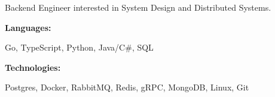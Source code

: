 \documentclass[9pt]{developercv} %
\begin{document}
\begin{minipage}[t]{0.46\textwidth}
	\vspace{-6pt}
Backend Engineer interested in System Design and Distributed Systems.
\end{minipage}
\hfill %
\begin{minipage}[t]{0.465\textwidth}
    \vspace{-6pt}
    
    \begin{minipage}[t]{0.2\textwidth}
        \textbf{Languages:}
    \end{minipage}
    \hfill
    \begin{minipage}[t]{0.73\textwidth}
      Go, TypeScript, Python, Java/C#, SQL
    \end{minipage}
    \vspace{4mm}
    
    \begin{minipage}[t]{0.2\textwidth}
        \textbf{Technologies:}
    \end{minipage}
    \hfill
    \begin{minipage}[t]{0.73\textwidth}
      Postgres, Docker, RabbitMQ, Redis, gRPC, MongoDB, Linux, Git
    \end{minipage}
    
\end{minipage}
\end{document}
